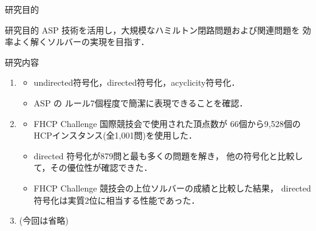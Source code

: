 \documentclass[dvipdfmx]{beamer}
\begin{document}
\begin{frame}{研究目的}
  \begin{alertblock}{研究目的}
    ASP 技術を活用し，大規模なハミルトン閉路問題および関連問題を
    効率よく解くソルバーの実現を目指す．
  \end{alertblock}
  \pause
  \begin{block}{研究内容}
    \begin{enumerate}
    \item {}
      \begin{itemize}
      \item \textsf{undirected}符号化，\textsf{directed}符号化，\textsf{acyclicity}符号化．
      \item ASP の \alert{ルール7個}程度で簡潔に表現できることを確認．
      \end{itemize}
      \pause
    \item {}
      \begin{itemize}
      \item \alert{FHCP Challenge 国際競技会}で使用された頂点数が
        66個から9,528個の HCPインスタンス(全1,001問)を使用した．
      \item directed 符号化が879問と最も多くの問題を解き，
        他の符号化と比較して，その優位性が確認できた．
      \item FHCP Challenge 競技会の上位ソルバーの成績と比較した結果，
        directed 符号化は\alert{実質2位}に相当する性能であった．
      \end{itemize}
      \pause
    \item {} (今回は省略)
      \end{enumerate}
  \end{block}
\end{frame}
\end{document}
